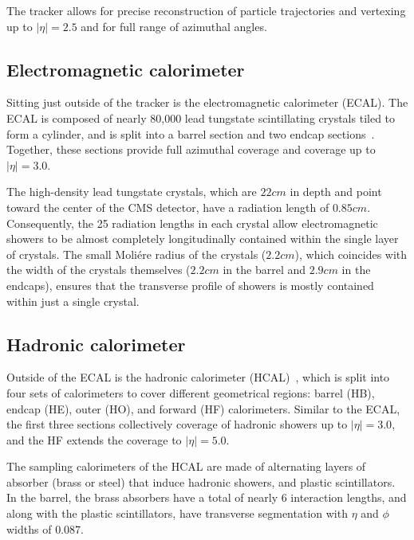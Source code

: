 The tracker allows for precise reconstruction of particle trajectories and 
vertexing up to $|\eta|=2.5$ and for full range of azimuthal angles.


\subsection{Electromagnetic calorimeter}

Sitting just outside of the tracker is the electromagnetic calorimeter (ECAL).
The ECAL is composed of nearly 80,000 lead tungstate scintillating crystals tiled to form a cylinder,
and is split into a barrel section and two endcap sections~\cite{CMS:Khachatryan2015hwa}.
Together, these sections provide full azimuthal coverage and coverage up to $|\eta|=3.0$.

The high-density lead tungstate crystals, which are $22\unit{cm}$ in depth
and point toward the center of the CMS detector,
have a radiation length of $0.85\unit{cm}$. Consequently, the 25 radiation
lengths in each crystal allow electromagnetic showers to be almost completely
longitudinally contained within the single layer of crystals. The small
Moli\'ere radius of the crystals ($2.2\unit{cm}$), which coincides with the
width of the crystals themselves ($2.2\unit{cm}$ in the barrel and
$2.9\unit{cm}$ in the endcaps), ensures that the transverse profile of
showers is mostly contained within just a single crystal.

\subsection{Hadronic calorimeter}

Outside of the ECAL is the hadronic calorimeter (HCAL)~\cite{CMS:PTDR2},
which is split into four sets of calorimeters to cover different geometrical
regions: barrel (HB), endcap (HE), outer (HO), and forward (HF) calorimeters.
Similar to the ECAL, the first three sections collectively coverage of hadronic showers 
up to $|\eta|=3.0$, and the HF extends the coverage to $|\eta|=5.0$.

The sampling calorimeters of the HCAL are made of alternating layers of
absorber (brass or steel) that induce hadronic showers, and plastic
scintillators. In the barrel, the brass absorbers have a total of nearly 6
interaction lengths, and along with the plastic scintillators, have
transverse segmentation with $\eta$ and $\phi$ widths of 0.087.

